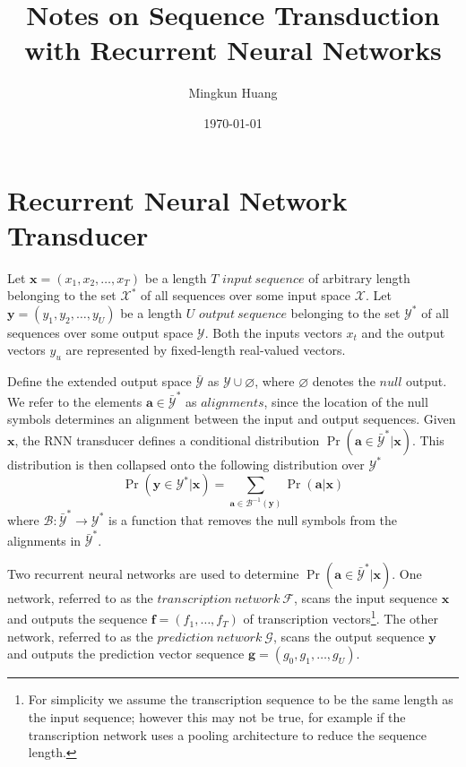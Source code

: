 \documentclass{article}
\title{Notes on Sequence Transduction with Recurrent Neural Networks}
\author{Mingkun Huang}
\date{\today}
\begin{document}
\maketitle

\def \x {\mathbf{x}}
\def \y {\mathbf{y}}
\def \a {\mathbf{a}}
\def \f {\mathbf{f}}
\def \g {\mathbf{g}}
\def \X {\mathcal{X}}
\def \Y {\mathcal{Y}}

\section{Recurrent Neural Network Transducer}
Let $\x = (x_1, x_2, \dots, x_T)$ be a length $T$ $input\ sequence$ of arbitrary length belonging to the set $\X^*$ of all sequences over some input space $\X$.
Let $\y = (y_1, y_2, \dots, y_U)$ be a length $U$ $output\ sequence$ belonging to the set $\Y^*$ of all sequences over some output space $\Y$.
Both the inputs vectors $x_t$ and the output vectors $y_u$ are represented by fixed-length real-valued vectors.

Define the extended output space $\bar{\Y}$ as $\Y \cup \varnothing$, where $\varnothing$ denotes the $null$ output.
We refer to the elements $\a \in \bar{\Y}^*$ as $alignments$, since the location of the null symbols determines an alignment between the input and output sequences.
Given $\x$, the RNN transducer defines a conditional distribution $\Pr(\a \in \bar{\Y}^* | \x)$. 
This distribution is then collapsed onto the following distribution over $\Y^*$
\begin{equation}
    \Pr(\y \in \Y^* | \x) = \sum_{\a \in \mathcal{B}^{-1}(\y)} \Pr(\a | \x)
\end{equation}
where $\mathcal{B}: \bar{\Y}^* \rightarrow \Y^*$ is a function that removes the null symbols from the alignments in $\bar{\Y}^*$.

Two recurrent neural networks are used to determine $\Pr(\a \in \bar{\Y}^* | \x)$.
One network, referred to as the $transcription\ network\ \mathcal{F}$, scans the input sequence $\x$ and outputs the sequence $\f = (f_1, \dots, f_T)$ of transcription vectors\footnote{For simplicity we assume the transcription sequence to be the same length as the input sequence; however this may not be true, for example if the transcription network uses a pooling architecture to reduce the sequence length.}.
The other network, referred to as the $prediction\ network\ \mathcal{G}$, scans the output sequence $\y$ and outputs the prediction vector sequence $\g = (g_0, g_1, \dots, g_U)$.
\end{document}
